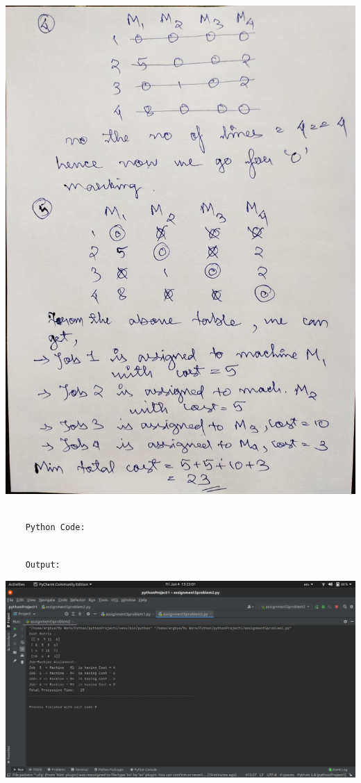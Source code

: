 \documentclass[12pt, letterpaper, twoside]{book}
\begin{document}
\includegraphics[width=\paperwidth, height=\paperheight]{Page11}
\begin{lstlisting}

	Python Code:

\end{lstlisting}

\pagebreak
\begin{lstlisting}

	Output:

\end{lstlisting}


\includegraphics[width=550pt]{Output2}
\end{document}
